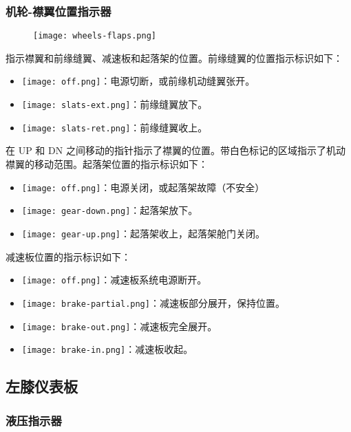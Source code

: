 \subsubsection{机轮-襟翼位置指示器}

\begin{figure}[htb]
	\centering
	\texttt{[image: wheels-flaps.png]}
\end{figure}

指示襟翼和前缘缝翼、减速板和起落架的位置。前缘缝翼的位置指示标识如下：
\begin{itemize}
	\item \texttt{[image: off.png]}：电源切断，或前缘机动缝翼张开。
	\item \texttt{[image: slats-ext.png]}：前缘缝翼放下。
	\item \texttt{[image: slats-ret.png]}：前缘缝翼收上。
\end{itemize}

在 UP 和 DN 之间移动的指针指示了襟翼的位置。带白色标记的区域指示了机动襟翼的移动范围。起落架位置的指示标识如下：
\begin{itemize}
	\item \texttt{[image: off.png]}：电源关闭，或起落架故障（不安全）
	\item \texttt{[image: gear-down.png]}：起落架放下。
	\item \texttt{[image: gear-up.png]}：起落架收上，起落架舱门关闭。
\end{itemize}

减速板位置的指示标识如下：
\begin{itemize}
	\item \texttt{[image: off.png]}：减速板系统电源断开。
	\item \texttt{[image: brake-partial.png]}：减速板部分展开，保持位置。
	\item \texttt{[image: brake-out.png]}：减速板完全展开。
	\item \texttt{[image: brake-in.png]}：减速板收起。
\end{itemize}

\subsection{左膝仪表板}

\subsubsection{液压指示器}

